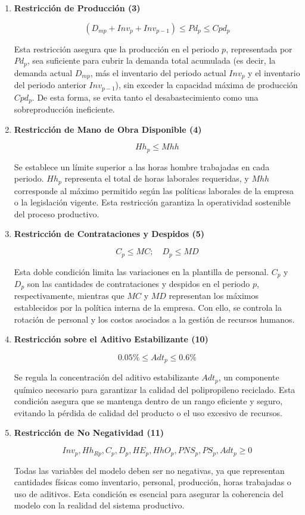 \documentclass[a4paper,12pt]{article}
\begin{document}
\begin{enumerate}
    \item \textbf{Restricción de Producción (3)}
    
    \[
    (D_{mp} + Inv_p + Inv_{p-1}) \leq Pd_p \leq Cpd_p
    \]
    
    Esta restricción asegura que la producción en el periodo \(p\), representada por \(Pd_p\), sea suficiente para cubrir la demanda total acumulada (es decir, la demanda actual \(D_{mp}\), más el inventario del periodo actual \(Inv_p\) y el inventario del periodo anterior \(Inv_{p-1}\)), sin exceder la capacidad máxima de producción \(Cpd_p\). De esta forma, se evita tanto el desabastecimiento como una sobreproducción ineficiente.

    \item \textbf{Restricción de Mano de Obra Disponible (4)}
    
    \[
    Hh_p \leq Mhh
    \]
    
    Se establece un límite superior a las horas hombre trabajadas en cada periodo. \(Hh_p\) representa el total de horas laborales requeridas, y \(Mhh\) corresponde al máximo permitido según las políticas laborales de la empresa o la legislación vigente. Esta restricción garantiza la operatividad sostenible del proceso productivo.

    \item \textbf{Restricción de Contrataciones y Despidos (5)}
    
    \[
    C_p \leq MC;\quad D_p \leq MD
    \]
    
    Esta doble condición limita las variaciones en la plantilla de personal. \(C_p\) y \(D_p\) son las cantidades de contrataciones y despidos en el periodo \(p\), respectivamente, mientras que \(MC\) y \(MD\) representan los máximos establecidos por la política interna de la empresa. Con ello, se controla la rotación de personal y los costos asociados a la gestión de recursos humanos.
\newpage    
    \item \textbf{Restricción sobre el Aditivo Estabilizante (10)}
    
    \[
    0.05\% \leq Adt_p \leq 0.6\%
    \]
    
    Se regula la concentración del aditivo estabilizante \(Adt_p\), un componente químico necesario para garantizar la calidad del polipropileno reciclado. Esta condición asegura que se mantenga dentro de un rango eficiente y seguro, evitando la pérdida de calidad del producto o el uso excesivo de recursos.

    \item \textbf{Restricción de No Negatividad (11)}
    
    \[
    Inv_p, Hh_{Rp}, C_p, D_p, HE_p, HhO_p, PNS_p, PS_p, Adt_p \geq 0
    \]
    
    Todas las variables del modelo deben ser no negativas, ya que representan cantidades físicas como inventario, personal, producción, horas trabajadas o uso de aditivos. Esta condición es esencial para asegurar la coherencia del modelo con la realidad del sistema productivo.
\end{enumerate}
\end{document}
